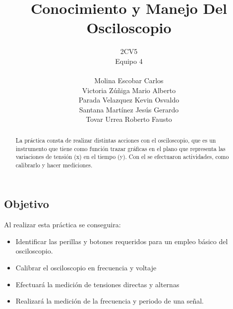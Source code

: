\documentclass[11pt]{article}
\title{Conocimiento y Manejo Del Osciloscopio}
\author{2CV5\\Equipo 4\\\\Molina Escobar Carlos\\Victoria Zúñiga Mario Alberto\\Parada Velazquez Kevin Osvaldo\\Santana Martínez Jesús Gerardo\\Tovar Urrea Roberto Fausto}
\date{}
\begin{document}
	
\maketitle

\begin{abstract}
	La práctica consta de realizar distintas acciones con el osciloscopio, que es un instrumento que tiene como función trazar gráficas en el plano que representa las variaciones de tensión (x) en el tiempo (y). Con el  se efectuaron actividades, como calibrarlo y hacer mediciones.
\end{abstract}


\begin{multicols}{2}

\section{Objetivo}
	Al realizar esta práctica se conseguira:
	\begin{itemize}
	
		\item Identificar las perillas y botones requeridos para un empleo básico del osciloscopio.
		\item Calibrar el osciloscopio en frecuencia y voltaje 
		\item Efectuará la medición de tensiones directas y alternas
		\item Realizará la medición de la frecuencia y periodo de una señal.

	\end{itemize}



\end{multicols}
\end{document}
